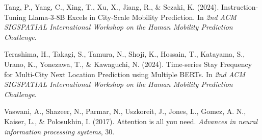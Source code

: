\documentclass[a4paper,12pt]{article}
\begin{document}
Tang, P., Yang, C., Xing, T., Xu, X., Jiang, R., \& Sezaki, K. (2024). Instruction-Tuning Llama-3-8B Excels in City-Scale Mobility Prediction. In \textit{2nd ACM SIGSPATIAL International Workshop on the Human Mobility Prediction Challenge}.

Terashima, H., Takagi, S., Tamura, N., Shoji, K., Hossain, T., Katayama, S., Urano, K., Yonezawa, T., \& Kawaguchi, N. (2024). Time-series Stay Frequency for Multi-City Next Location Prediction using Multiple BERTs. In \textit{2nd ACM SIGSPATIAL International Workshop on the Human Mobility Prediction Challenge}.

Vaswani, A., Shazeer, N., Parmar, N., Uszkoreit, J., Jones, L., Gomez, A. N., Kaiser, L., \& Polosukhin, I. (2017). Attention is all you need. \textit{Advances in neural information processing systems}, 30.
\end{document}
